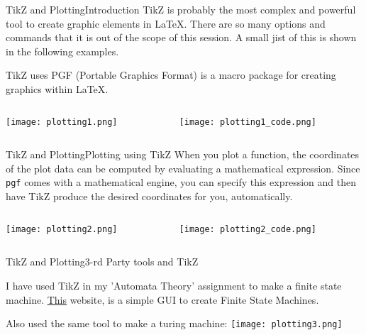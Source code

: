 \begin{frame}{TikZ and Plotting}{Introduction}
\small
TikZ is probably the most complex and powerful tool to create graphic elements
in \LaTeX. There are so many options and commands that it is out of the scope of
this session. A small jist of this is shown in the following examples.\\
\vspace{1em}

TikZ uses PGF (Portable Graphics Format) is a macro package for creating
graphics within \LaTeX.

\begin{columns}
    \begin{column}{0.3\textwidth}
        \texttt{[image: plotting1.png]}
    \end{column}
    \begin{column}{0.7\textwidth}
        \texttt{[image: plotting1\_code.png]}
    \end{column}
\end{columns}

\end{frame}

\begin{frame}{TikZ and Plotting}{Plotting using TikZ}
\small
When you plot a function, the coordinates of the plot data can be computed by
evaluating a mathematical expression. Since \texttt{pgf} comes with a mathematical
engine, you can specify this expression and then have TikZ produce the desired
coordinates for you, automatically.

\begin{columns}
    \begin{column}{0.4\textwidth}
        \texttt{[image: plotting2.png]}
    \end{column}
    \begin{column}{0.6\textwidth}
        \texttt{[image: plotting2\_code.png]}
    \end{column}
\end{columns}

\end{frame}


\begin{frame}{TikZ and Plotting}{3-rd Party tools and TikZ}

    \tiny
    I have used TikZ in my 'Automata Theory' assignment to make a finite state
    machine. \href{https://www.cs.unc.edu/~otternes/comp455/fsm\_designer/}{This}
    website, is a simple GUI to create Finite State Machines. \vspace{1em}

    Also used the same tool to make a turing machine:
    \center
    \texttt{[image: plotting3.png]}

\end{frame}
